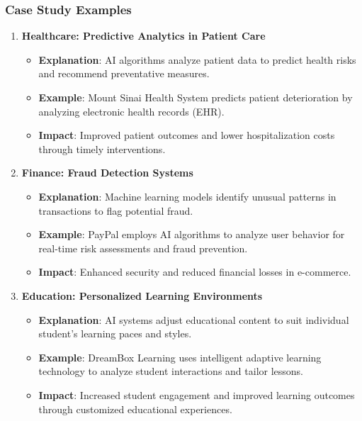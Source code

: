 \documentclass[aspectratio=169]{beamer}
\begin{document}
\begin{frame}[fragile]
    \frametitle{Case Study Examples}
    \begin{enumerate}
        \item \textbf{Healthcare: Predictive Analytics in Patient Care}
        \begin{itemize}
            \item \textbf{Explanation}: AI algorithms analyze patient data to predict health risks and recommend preventative measures.
            \item \textbf{Example}: Mount Sinai Health System predicts patient deterioration by analyzing electronic health records (EHR).
            \item \textbf{Impact}: Improved patient outcomes and lower hospitalization costs through timely interventions.
        \end{itemize}

        \item \textbf{Finance: Fraud Detection Systems}
        \begin{itemize}
            \item \textbf{Explanation}: Machine learning models identify unusual patterns in transactions to flag potential fraud.
            \item \textbf{Example}: PayPal employs AI algorithms to analyze user behavior for real-time risk assessments and fraud prevention.
            \item \textbf{Impact}: Enhanced security and reduced financial losses in e-commerce.
        \end{itemize}

        \item \textbf{Education: Personalized Learning Environments}
        \begin{itemize}
            \item \textbf{Explanation}: AI systems adjust educational content to suit individual student’s learning paces and styles.
            \item \textbf{Example}: DreamBox Learning uses intelligent adaptive learning technology to analyze student interactions and tailor lessons.
            \item \textbf{Impact}: Increased student engagement and improved learning outcomes through customized educational experiences.
        \end{itemize}
    \end{enumerate}
\end{frame}
\end{document}
